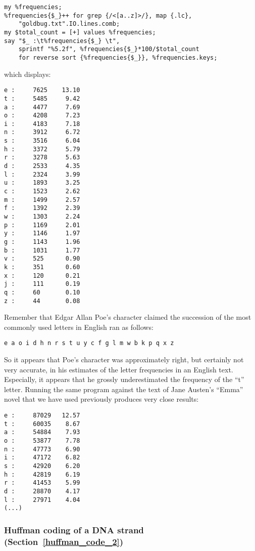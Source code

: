 \begin{verbatim}
my %frequencies;
%frequencies{$_}++ for grep {/<[a..z]>/}, map {.lc}, 
    "goldbug.txt".IO.lines.comb;
my $total_count = [+] values %frequencies;
say "$_ :\t%frequencies{$_} \t", 
    sprintf "%5.2f", %frequencies{$_}*100/$total_count  
    for reverse sort {%frequencies{$_}}, %frequencies.keys;
\end{verbatim}   

which displays:
\begin{verbatim}
e :     7625    13.10
t :     5485     9.42
a :     4477     7.69
o :     4208     7.23
i :     4183     7.18
n :     3912     6.72
s :     3516     6.04
h :     3372     5.79
r :     3278     5.63
d :     2533     4.35
l :     2324     3.99
u :     1893     3.25
c :     1523     2.62
m :     1499     2.57
f :     1392     2.39
w :     1303     2.24
p :     1169     2.01
y :     1146     1.97
g :     1143     1.96
b :     1031     1.77
v :     525      0.90
k :     351      0.60
x :     120      0.21
j :     111      0.19
q :     60       0.10
z :     44       0.08
\end{verbatim}

Remember that Edgar Allan Poe's character claimed the succession 
of the most commonly used letters in English ran as 
follows:

\begin{verbatim}
e a o i d h n r s t u y c f g l m w b k p q x z
\end{verbatim}

So it appears that Poe's character was approximately 
right, but certainly not very accurate, in his estimates of the 
letter frequencies in an English text. Especially, it appears 
that he grossly underestimated the frequency of the ``t'' letter. 
Running the same program against the text of Jane Austen's 
``Emma'' novel that we have used previously produces very 
close results:

\begin{verbatim}
e :     87029   12.57
t :     60035    8.67
a :     54884    7.93
o :     53877    7.78
n :     47773    6.90
i :     47172    6.82
s :     42920    6.20
h :     42819    6.19
r :     41453    5.99
d :     28870    4.17
l :     27971    4.04
(...)
\end{verbatim}

\subsubsection{Huffman coding of a DNA strand (Section~\ref{huffman_code_2})}
\label{sol_huffman_code_2}

